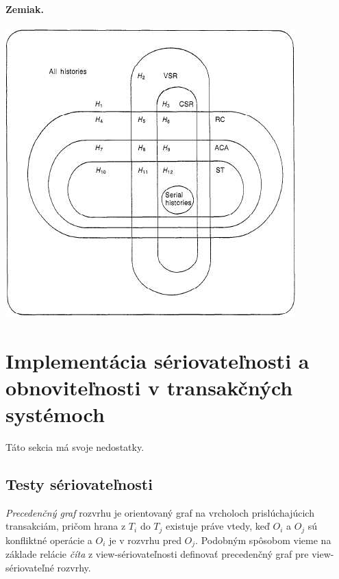 \documentclass[10pt,a4paper]{article}
\begin{document}
\paragraph{Zemiak.}
\begin{center}
\includegraphics[scale=0.5]{db_triedy_seriovatelnosti.png}
\end{center}
    
\section{Implementácia sériovateľnosti a obnoviteľnosti v transakčných systémoch} 
Táto sekcia má svoje nedostatky.

\subsection{Testy sériovateľnosti}
\label{test_seriovatelnosti}

\emph{Precedenčný graf} rozvrhu je orientovaný graf na vrcholoch prislúchajúcich transakciám,
pričom hrana z $T_i$ do $T_j$ existuje práve vtedy, keď $O_i$ a $O_j$ sú konfliktné operácie a $O_i$ je v rozvrhu pred $O_j$.  
Podobným spôsobom vieme na základe relácie \emph{číta} z view-sériovateľnosti definovať precedenčný graf pre view-sériovateľné rozvrhy. 
\end{document}
